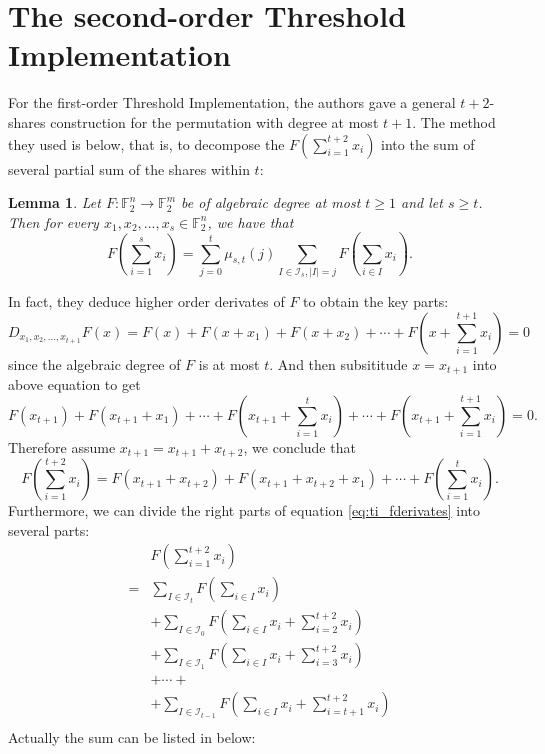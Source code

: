 \documentclass[12 pt]{article}
\newtheorem{lemma}{Lemma}
\def\F{{\mathbb F}}
\begin{document}
    \section{The second-order Threshold Implementation}
    
    For the first-order Threshold Implementation, the authors gave a general $ t+2 $-shares construction 
    for the permutation with degree at most $ t+1 $. The method they used is below, that is, to decompose the 
    $ F(\sum_{i=1}^{t+2}x_i) $ into the sum of several partial sum of the shares within $ t $:
    \begin{lemma}
      Let $ F:\F_2^n\rightarrow\F_2^m $ be of algebraic degree at most $ t\ge 1 $ and let $ s\ge t $. Then for every 
      $ x_1,x_2,...,x_s\in\F_2^n  $, we have that 
      \[F\left( \sum_{i=1}^{s}x_i \right)=\sum_{j=0}^{t}\mu_{s,t}(j)\sum_{I\in\mathcal{I}_s,|I|=j}F\left( \sum_{i\in I}x_i \right).\]
    \end{lemma} 
    In fact, they deduce higher order derivates of $ F $ to obtain the key parts:
    \[ D_{x_1,x_2,...,x_{t+1}}F(x)=F(x)+F(x+x_1)+F(x+x_2)+\cdots+F\left( x+\sum_{i=1}^{t+1}x_i \right)=0\]
    since the algebraic degree of $ F $ is at most $ t $. And then subsititude $ x = x_{t+1} $ into above equation to get
    \[F(x_{t+1})+F(x_{t+1}+x_1)+\cdots+F\left( x_{t+1}+\sum_{i=1}^{t}x_i \right)+\cdots+F\left( x_{t+1}+\sum_{i=1}^{t+1}x_i \right)=0.\]
    Therefore  assume $ x_{t+1}=x_{t+1}+x_{t+2} $, we conclude that 
    \begin{equation}\label{eq:ti_fderivates}
      F\left( \sum_{i=1}^{t+2}x_i \right)=F(x_{t+1}+x_{t+2})+F(x_{t+1}+x_{t+2}+x_1)+\cdots+F\left( \sum_{i=1}^{t}x_i \right).
    \end{equation}
    Furthermore, we can divide the right parts of equation \eqref{eq:ti_fderivates} into several parts:
    \begin{align*}
      &F\left( \sum_{i=1}^{t+2}x_i \right)\\
      =& \sum_{I\in\mathcal{I}_t}F\left( \sum_{i\in I}x_i \right)\\
       &+ \sum_{I\in\mathcal{I}_0}F\left( \sum_{i\in I}x_i+\sum_{i=2}^{t+2}x_i \right)\\
       &+ \sum_{I\in\mathcal{I}_1}F\left( \sum_{i\in I}x_i+\sum_{i=3}^{t+2}x_i \right)\\
       &+ \cdots +\\
       &+ \sum_{I\in\mathcal{I}_{t-1}}F\left( \sum_{i\in I}x_i+\sum_{i=t+1}^{t+2}x_i \right)\\
    \end{align*}
    Actually the sum can be listed in below:
\end{document}
